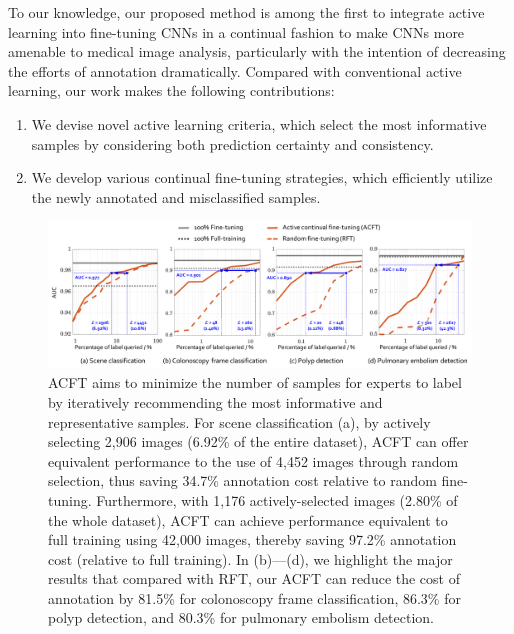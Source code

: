 To our knowledge, our proposed method is among the first to integrate active learning into fine-tuning CNNs in a continual fashion to make CNNs more amenable to medical image analysis, particularly with the intention of decreasing the efforts of annotation dramatically. Compared with conventional active learning, our work makes the following contributions:

\begin{enumerate}
    \item We devise novel active learning criteria, which select the most informative samples by considering both prediction certainty and consistency.
    \item We develop various continual fine-tuning strategies, which efficiently utilize the newly annotated and misclassified samples.
\end{enumerate}


\begin{figure}
\begin{center}
\includegraphics[width=0.95\columnwidth]{Figures/CH3/fig_result_highlights.pdf}
\end{center}
\caption[Active Continual Fine-tuning Reduces over 80\% Annotation Cost]{
ACFT aims to minimize the number of samples for experts to label by iteratively recommending the most informative and representative samples. For scene classification (a), by actively selecting 2,906 images (6.92\% of the entire dataset), ACFT can offer equivalent performance to the use of 4,452 images through random selection, thus saving 34.7\% annotation cost relative to random fine-tuning. Furthermore, with 1,176 actively-selected images (2.80\% of the whole dataset), ACFT can achieve performance equivalent to full training using 42,000 images, thereby saving 97.2\% annotation cost (relative to full training). 
In (b)---(d), we highlight the major results that compared with RFT, our ACFT can reduce the cost of annotation by 81.5\% for colonoscopy frame classification, 86.3\% for polyp detection, and 80.3\% for pulmonary embolism detection. 
}
\label{ch3:fig:overall_result}
\end{figure}

